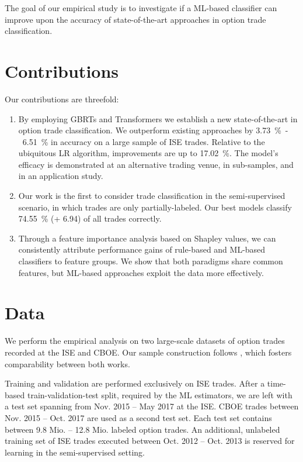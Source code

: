 \documentclass[oneside,a4paper,10pt]{article} %
\begin{document}
The goal of our empirical study is to investigate if a \gls{ML}-based classifier can improve upon the accuracy of state-of-the-art approaches in option trade classification.

\section{Contributions}

Our contributions are threefold: 
\begin{enumerate}[label=(\roman*),noitemsep]
\item By employing \glspl{GBRT} and Transformers we establish a new state-of-the-art in option trade classification. We outperform existing approaches by \SI{3.73}{\percent}~-~\SI{6.51}{\percent} in accuracy on a large sample of \gls{ISE} trades. Relative to the ubiquitous \gls{LR} algorithm, improvements are up to \SI{17.02}{\percent}. 
The model's efficacy is demonstrated at an alternative trading venue, in sub-samples, and in an application study.
\item Our work is the first to consider trade classification in the semi-supervised scenario, in which trades are only partially-labeled. Our best models classify \SI{74.55}{\percent} (+ 6.94) of all trades correctly.
\item Through a feature importance analysis based on Shapley values, we can consistently attribute performance gains of rule-based and \gls{ML}-based classifiers to feature groups. We show that both paradigms share common features, but \gls{ML}-based approaches exploit the data more effectively.
\end{enumerate}

\section{Data}

We perform the empirical analysis on two large-scale datasets of option trades recorded at the \gls{ISE} and \gls{CBOE}. Our sample construction follows \textcite[][]{grauerOptionTradeClassification2022}, which fosters comparability between both works. 

Training and validation are performed exclusively on \gls{ISE} trades. After a time-based train-validation-test split, required by the \gls{ML} estimators, we are left with a test set spanning from Nov. 2015 -- May 2017 at the \gls{ISE}. \gls{CBOE} trades between Nov. 2015 -- Oct. 2017 are used as a second test set. Each test set contains between 9.8 Mio. --  12.8 Mio. labeled option trades. An additional, unlabeled training set of \gls{ISE} trades executed between Oct. 2012 -- Oct. 2013 is reserved for learning in the semi-supervised setting.
\end{document}
